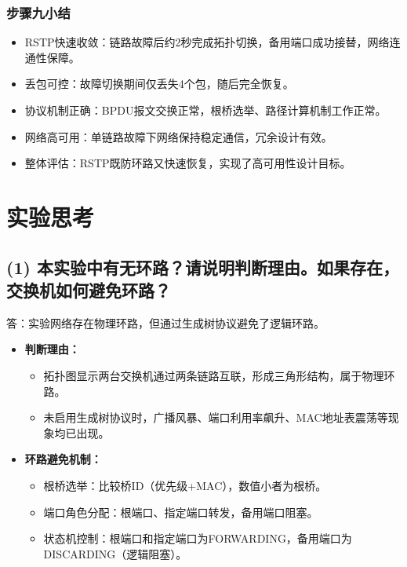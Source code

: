 \documentclass[a4paper]{article}
\begin{document}
\subsubsection{步骤九小结}
\begin{itemize}
    \item RSTP快速收敛：链路故障后约2秒完成拓扑切换，备用端口成功接替，网络连通性保障。
    \item 丢包可控：故障切换期间仅丢失4个包，随后完全恢复。
    \item 协议机制正确：BPDU报文交换正常，根桥选举、路径计算机制工作正常。
    \item 网络高可用：单链路故障下网络保持稳定通信，冗余设计有效。
    \item 整体评估：RSTP既防环路又快速恢复，实现了高可用性设计目标。
\end{itemize}

\section{实验思考}
\subsection*{(1) 本实验中有无环路？请说明判断理由。如果存在，交换机如何避免环路？}
答：实验网络存在物理环路，但通过生成树协议避免了逻辑环路。
\begin{itemize}
    \item \textbf{判断理由：}
    \begin{itemize}
        \item 拓扑图显示两台交换机通过两条链路互联，形成三角形结构，属于物理环路。
        \item 未启用生成树协议时，广播风暴、端口利用率飙升、MAC地址表震荡等现象均已出现。
    \end{itemize}
    \item \textbf{环路避免机制：}
    \begin{itemize}
        \item 根桥选举：比较桥ID（优先级+MAC），数值小者为根桥。
        \item 端口角色分配：根端口、指定端口转发，备用端口阻塞。
        \item 状态机控制：根端口和指定端口为FORWARDING，备用端口为DISCARDING（逻辑阻塞）。
    \end{itemize}
\end{itemize}
\end{document}
